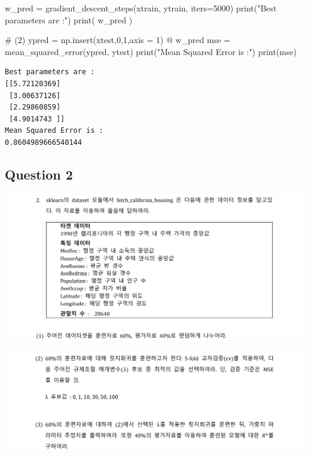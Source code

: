 \documentclass[
  letterpaper,
  DIV=11,
  numbers=noendperiod]{scrartcl}
\newenvironment{Shaded}{\begin{snugshade}}{\end{snugshade}}
\newcommand{\BuiltInTok}[1]{\textcolor[rgb]{0.00,0.23,0.31}{#1}}
\newcommand{\CommentTok}[1]{\textcolor[rgb]{0.37,0.37,0.37}{#1}}
\newcommand{\DecValTok}[1]{\textcolor[rgb]{0.68,0.00,0.00}{#1}}
\newcommand{\NormalTok}[1]{\textcolor[rgb]{0.00,0.23,0.31}{#1}}
\newcommand{\OperatorTok}[1]{\textcolor[rgb]{0.37,0.37,0.37}{#1}}
\newcommand{\StringTok}[1]{\textcolor[rgb]{0.13,0.47,0.30}{#1}}
\begin{document}
\begin{Shaded}
\begin{Highlighting}[]
\NormalTok{w\_pred }\OperatorTok{=}\NormalTok{ gradient\_descent\_steps(xtrain, ytrain, iters}\OperatorTok{=}\DecValTok{5000}\NormalTok{)}
\BuiltInTok{print}\NormalTok{(}\StringTok{"Best parameters are :"}\NormalTok{)}
\BuiltInTok{print}\NormalTok{( w\_pred )}

\CommentTok{\# (2)}
\NormalTok{ypred }\OperatorTok{=}\NormalTok{ np.insert(xtest,}\DecValTok{0}\NormalTok{,}\DecValTok{1}\NormalTok{,axis }\OperatorTok{=} \DecValTok{1}\NormalTok{) }\OperatorTok{@}\NormalTok{ w\_pred}
\NormalTok{mse }\OperatorTok{=}\NormalTok{ mean\_squared\_error(ypred, ytest)}
\BuiltInTok{print}\NormalTok{(}\StringTok{"Mean Squared Error is :"}\NormalTok{)}
\BuiltInTok{print}\NormalTok{(mse)}
\end{Highlighting}
\end{Shaded}

\begin{verbatim}
Best parameters are :
[[5.72120369]
 [3.00637126]
 [2.29860859]
 [4.9014743 ]]
Mean Squared Error is :
0.8604989666540144
\end{verbatim}

\subsection{Question 2}\label{question-2}

\includegraphics{image/machine_hw1_2.png}

\includegraphics{image/machine_hw1_3.png}
\end{document}
